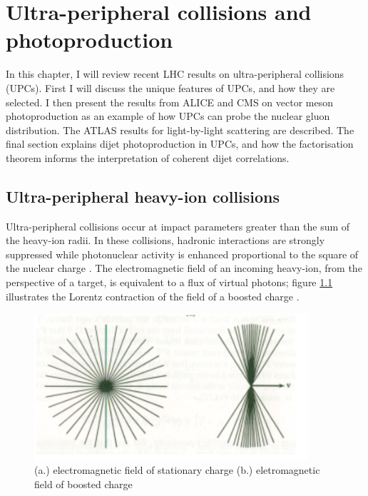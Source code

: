 \setlength\abovedisplayskip{0.4pt}
\setlength\belowdisplayskip{0.4pt}

\chapter{Ultra-peripheral collisions and photoproduction}

In this chapter, I will review recent LHC results on ultra-peripheral collisions (UPCs). First I will discuss the unique features of UPCs, and how they are selected. I then present the results from ALICE and CMS on vector meson photoproduction as an example of how UPCs can probe the nuclear gluon distribution. The ATLAS results for light-by-light scattering are described. The final section explains dijet photoproduction in UPCs, and how the factorisation theorem informs the interpretation of coherent dijet correlations. 

\section{Ultra-peripheral heavy-ion collisions}

Ultra-peripheral collisions occur at impact parameters greater than the sum of the heavy-ion radii. In these collisions, hadronic interactions are strongly suppressed while photonuclear activity is enhanced proportional to the square of the nuclear charge \cite{Hands:2001ve}. The electromagnetic field of an incoming heavy-ion, from the perspective of a target, is equivalent to a flux of virtual photons; figure \ref{fig:smushedField} illustrates the Lorentz contraction of the field of a boosted charge \cite{Baltz:2007kq}\cite{WWJackson}.

\begin{figure}[h!]
\begin{centering}
\includegraphics[width=4in]{Chapter1/importfigs/jackson_em_wwa.png}
\par\end{centering}
\caption{ (a.) electromagnetic field of stationary charge (b.) eletromagnetic field of boosted charge \cite{WWJackson} \label{fig:smushedField}}
\end{figure}

